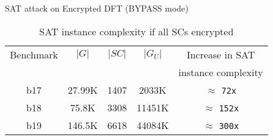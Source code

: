 \begin{frame}{SAT attack on Encrypted DFT (BYPASS mode)}
\begin{table}[!htbp]
\begin{center}
\caption{SAT instance complexity if all SCs encrypted}
\label{tab:allSCs-encrypted}
\begin{tabular}{|c|c|c|c|c|}
\hline
	Benchmark & $|G|$ & $|SC|$ & $|G_U|$ & Increase in SAT \\
		  &          &     &         & instance complexity \\
	\hline
	b17 & 27.99K & 1407 & 2033K & $\approx$ \texttt{72x}\\
	\hline
	b18 & 75.8K  & 3308 & 11451K & $\approx$ \texttt{152x}\\
	\hline 
	b19 & 146.5K & 6618 & 44084K & $\approx$ \texttt{300x}\\
\hline
\end{tabular}
\end{center}
\end{table}
\end{frame}

